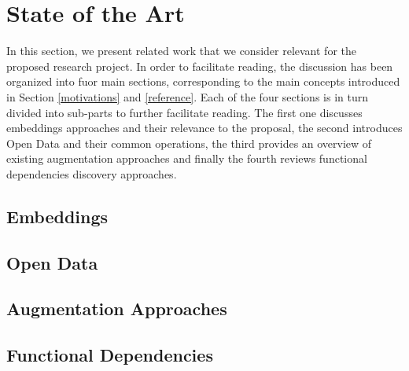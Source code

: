 \section{State of the Art}\label{related}
In this section, we present related work that we consider relevant for the proposed research project. In order to facilitate reading, the discussion has been organized into fuor main sections, corresponding to the main concepts introduced in Section \ref{motivations} and \ref{reference}. Each of the four sections is in turn divided into sub-parts to further facilitate reading. The first one discusses embeddings approaches and their relevance to the proposal, the second introduces Open Data and their common operations, the third provides an overview of existing augmentation approaches and finally the fourth reviews functional dependencies discovery approaches.

\subsection{Embeddings}

\subsection{Open Data}

\subsection{Augmentation Approaches}

\subsection{Functional Dependencies}